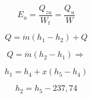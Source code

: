 

\item[d)] 
    \begin{equation*}
        E_u = \frac{Q_{zu}}{W_t} = \frac{Q_{u}}{W}
    \end{equation*}
    
    \begin{equation*}
        Q = \dot{m} (h_1 - h_2) + Q
    \end{equation*}
    
    \begin{equation*}
        Q = \dot{m} (h_2 - h_1) \Rightarrow
    \end{equation*}
    
    \begin{equation*}
        h_1 = h_4 + x (h_5 - h_4)
    \end{equation*}
    
    \begin{equation*}
        h_2 = h_5 - 237,74
    \end{equation*}